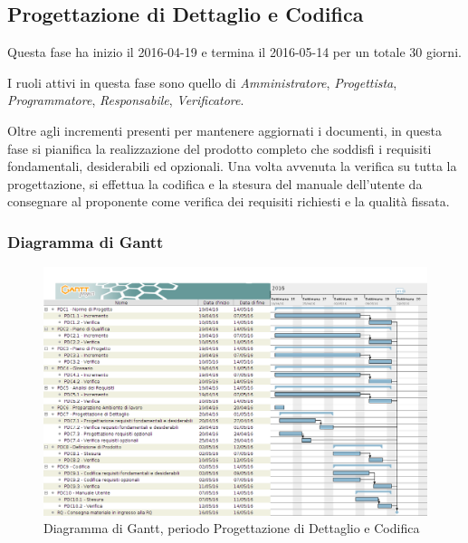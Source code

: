 \newpage

\subsection{Progettazione di Dettaglio e Codifica}
Questa fase ha inizio il 2016-04-19 e termina il 2016-05-14 per un totale 30 giorni.

I ruoli attivi in questa fase sono quello di \textit{Amministratore}, \textit{Progettista}, \textit{Programmatore}, \textit{Responsabile}, \textit{Verificatore}.

Oltre agli incrementi presenti per mantenere aggiornati i documenti, in questa fase si pianifica la realizzazione del prodotto completo che soddisfi i requisiti fondamentali, desiderabili ed opzionali. Una volta avvenuta la verifica su tutta la progettazione, si effettua la codifica e la stesura del manuale dell'utente da consegnare al proponente come verifica dei requisiti richiesti e la qualit\`a fissata.

\subsubsection{Diagramma di Gantt}
\begin{figure}[ht!]
  \includegraphics[width=1\textwidth]{res/img/pianificazione/ProgettazioneDettaglioECodifica.png}
  \caption{Diagramma di Gantt, periodo Progettazione di Dettaglio e Codifica}
\end{figure}

